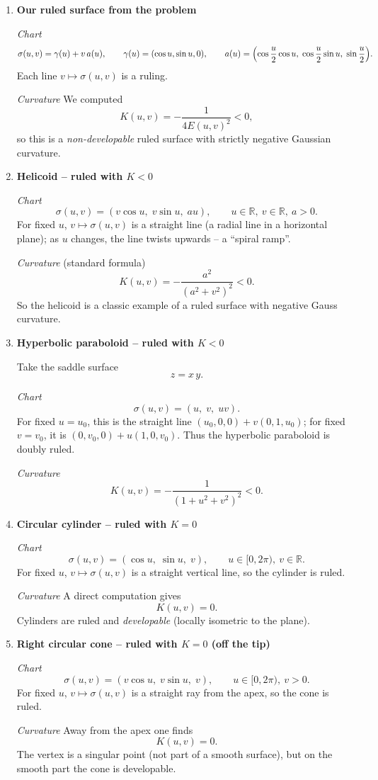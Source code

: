 \documentclass[12pt,a4paper]{article}
\theoremstyle{plain}
\theoremstyle{definition}      %
\begin{document}
\begin{enumerate}
	\item \textbf{Our ruled surface from the problem}
	
	\emph{Chart}
	\[
	\sigma(u,v)=\gamma(u)+v\,a(u),\qquad
	\gamma(u)=(\cos u,\sin u,0),\qquad
	a(u)=\Bigl(\cos\frac u2\cos u,\;\cos\frac u2\sin u,\;\sin\frac u2\Bigr).
	\]
	Each line $v\mapsto\sigma(u,v)$ is a ruling.
	
	\smallskip
	\emph{Curvature}
	We computed
	\[
	K(u,v)=-\frac{1}{4E(u,v)^2}<0,
	\]
	so this is a \emph{non-developable} ruled surface with strictly negative
	Gaussian curvature.
	
	\item \textbf{Helicoid – ruled with $K<0$}
	
	\emph{Chart}
	\[
	\sigma(u,v)=(v\cos u,\;v\sin u,\;a u),\qquad
	u\in\mathbb{R},\ v\in\mathbb{R},\ a>0.
	\]
	For fixed $u$, $v\mapsto\sigma(u,v)$ is a straight line (a radial line in a
	horizontal plane); as $u$ changes, the line twists upwards – a ``spiral
	ramp''.
	
	\smallskip
	\emph{Curvature} (standard formula)
	\[
	K(u,v)=-\frac{a^{2}}{(a^{2}+v^{2})^{2}}<0.
	\]
	So the helicoid is a classic example of a ruled surface with negative Gauss
	curvature.
	
	\item \textbf{Hyperbolic paraboloid – ruled with $K<0$}
	
	Take the saddle surface
	\[
	z = x\,y.
	\]
	
	\emph{Chart}
	\[
	\sigma(u,v)=(u,\;v,\;u v).
	\]
	For fixed $u=u_0$, this is the straight line
	$(u_0,0,0)+v(0,1,u_0)$; for fixed $v=v_0$, it is
	$(0,v_0,0)+u(1,0,v_0)$.  Thus the hyperbolic paraboloid is doubly ruled.
	
	\smallskip
	\emph{Curvature}
	\[
	K(u,v)=-\frac{1}{(1+u^{2}+v^{2})^{2}}<0.
	\]
	
	\item \textbf{Circular cylinder – ruled with $K=0$}
	
	\emph{Chart}
	\[
	\sigma(u,v)=(\cos u,\;\sin u,\;v),\qquad
	u\in[0,2\pi),\ v\in\mathbb{R}.
	\]
	For fixed $u$, $v\mapsto\sigma(u,v)$ is a straight vertical line, so the
	cylinder is ruled.
	
	\smallskip
	\emph{Curvature}
	A direct computation gives
	\[
	K(u,v)=0.
	\]
	Cylinders are ruled and \emph{developable} (locally isometric to the plane).
	
	\item \textbf{Right circular cone – ruled with $K=0$ (off the tip)}
	
	\emph{Chart}
	\[
	\sigma(u,v)=(v\cos u,\;v\sin u,\;v),\qquad
	u\in[0,2\pi),\ v>0.
	\]
	For fixed $u$, $v\mapsto\sigma(u,v)$ is a straight ray from the apex, so the
	cone is ruled.
	
	\smallskip
	\emph{Curvature}
	Away from the apex one finds
	\[
	K(u,v)=0.
	\]
	The vertex is a singular point (not part of a smooth surface), but on the
	smooth part the cone is developable.
\end{enumerate}	
	
\end{document}
